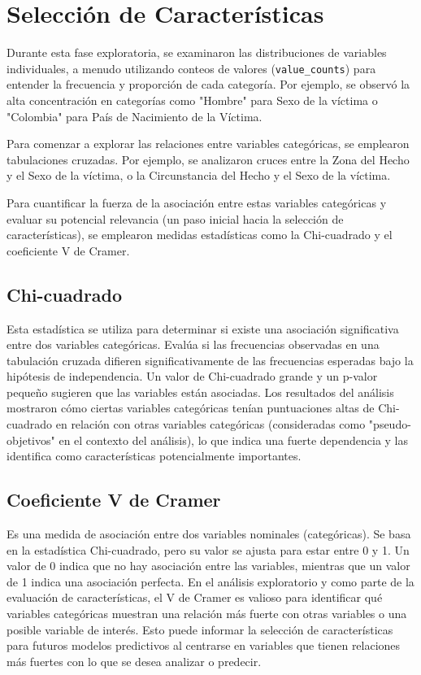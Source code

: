 \documentclass[lettersize,journal]{IEEEtran}
\begin{document}
\section{Selección de Características}
Durante esta fase exploratoria, se examinaron las distribuciones de variables individuales, a menudo utilizando conteos de valores (\texttt{value\_counts}) para entender la frecuencia y proporción de cada categoría. Por ejemplo, se observó la alta concentración en categorías como "Hombre" para Sexo de la víctima o "Colombia" para País de Nacimiento de la Víctima.

Para comenzar a explorar las relaciones entre variables categóricas, se emplearon tabulaciones cruzadas. Por ejemplo, se analizaron cruces entre la Zona del Hecho y el Sexo de la víctima, o la Circunstancia del Hecho y el Sexo de la víctima.

Para cuantificar la fuerza de la asociación entre estas variables categóricas y evaluar su potencial relevancia (un paso inicial hacia la selección de características), se emplearon medidas estadísticas como la Chi-cuadrado y el coeficiente V de Cramer.

\subsection{Chi-cuadrado}
Esta estadística se utiliza para determinar si existe una asociación significativa entre dos variables categóricas. Evalúa si las frecuencias observadas en una tabulación cruzada difieren significativamente de las frecuencias esperadas bajo la hipótesis de independencia. Un valor de Chi-cuadrado grande y un p-valor pequeño sugieren que las variables están asociadas. Los resultados del análisis mostraron cómo ciertas variables categóricas tenían puntuaciones altas de Chi-cuadrado en relación con otras variables categóricas (consideradas como "pseudo-objetivos" en el contexto del análisis), lo que indica una fuerte dependencia y las identifica como características potencialmente importantes.

\subsection{Coeficiente V de Cramer}
Es una medida de asociación entre dos variables nominales (categóricas). Se basa en la estadística Chi-cuadrado, pero su valor se ajusta para estar entre 0 y 1. Un valor de 0 indica que no hay asociación entre las variables, mientras que un valor de 1 indica una asociación perfecta. En el análisis exploratorio y como parte de la evaluación de características, el V de Cramer es valioso para identificar qué variables categóricas muestran una relación más fuerte con otras variables o una posible variable de interés. Esto puede informar la selección de características para futuros modelos predictivos al centrarse en variables que tienen relaciones más fuertes con lo que se desea analizar o predecir.
\end{document}
